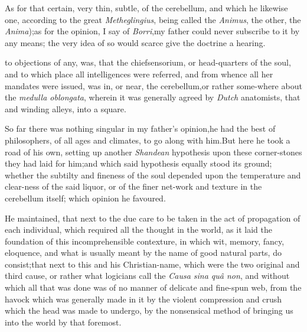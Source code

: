 \documentclass{article}
\begin{document}
As for that certain, very thin, subtle, 
\pb 
of the cerebellum, and which he likewise
one, according to the great \textit{Metheglingius},
being called the \textit{Animus}, the other, the
\textit{Anima});\tsk as for the opinion, I say of
\textit{Borri},\tsk my father could never subscribe to it by any
means; the very idea of so 
would scarce give the doctrine a hearing.

\noindent
{}
to objections of any, was, that the chief\pb sensorium, or
head-quarters of the soul, and to which place all intelligences
were referred, and from whence all her mandates were issued,\tsk
was in, or near, the\break
cerebellum,\tsk or rather some-where about
the \textit{medulla oblongata}, wherein it was ge\-nerally agreed
by \textit{Dutch} anatomists, that
 and
winding alleys, into a square.

So far there was nothing singular in my father’s
opinion,\tsk he had the best of philosophers, of all ages and
climates, to go along with him.\tsk But here he took a\break
road of his own, setting up another \textit{Shan\-dean} hypothesis upon
these corner-stones they had laid for him;\tsk and which
said hypothesis equally stood its ground; whe\-ther the subtilty and
fineness of the soul depended upon the temperature and clear-\pb ness of
the said liquor, or of the finer net-work and texture in the
cerebellum itself; which opinion he favoured.

He maintained, that next to the due care to be taken in the act
of propagation of each individual, which required all the thought
in the world, as it laid the foundation of this incomprehensible
contexture, in which wit, memory, fancy, eloquence, and what is
usually meant by the name of good natural parts, do
consist;\tsk that next to this and his Christian-name, which were
the two original and
third cause, or rather what logicians
call the \textit{Causa sina quâ non}, and without which all that was
done was of no manner of 
 delicate and fine-spun web, from the havock
which was generally made in it by\pb
the violent compression and crush
which the head was made to undergo, by the nonsensical method of
bringing us into the world by that foremost.
\end{document}
